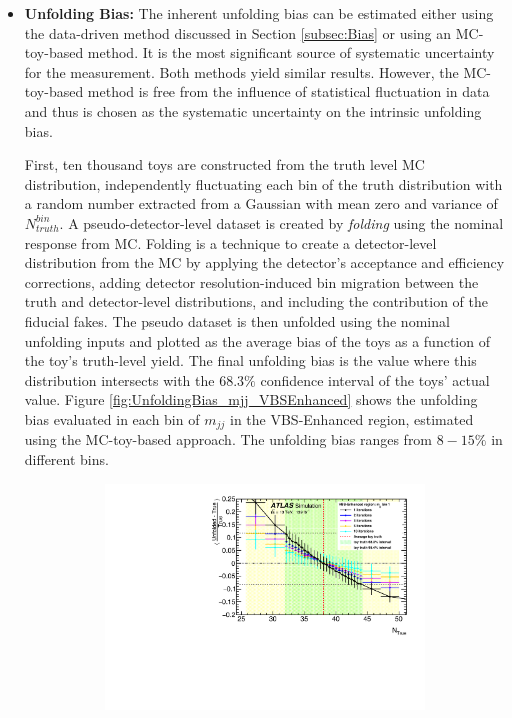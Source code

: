 \begin{itemize}
    \item{\textbf{Unfolding Bias:} The inherent unfolding bias can be estimated either using the data-driven method discussed in Section \ref{subsec:Bias} or using an MC-toy-based method. It is the most significant source of systematic uncertainty for the measurement. Both methods yield similar results. However, the MC-toy-based method is free from the influence of statistical fluctuation in data and thus is chosen as the systematic uncertainty on the intrinsic unfolding bias. 

    First, ten thousand toys are constructed from the truth level MC distribution, independently fluctuating each bin of the truth distribution with a random number extracted from a Gaussian with mean zero and variance of $N_{truth}^{bin}$. A pseudo-detector-level dataset is created by \textit{folding} using the nominal response from MC. Folding is a technique to create a detector-level distribution from the MC by applying the detector's acceptance and efficiency corrections, adding detector resolution-induced bin migration between the truth and detector-level distributions, and including the contribution of the fiducial fakes. The pseudo dataset is then unfolded using the nominal unfolding inputs and plotted as the average bias of the toys as a function of the toy's truth-level yield. The final unfolding bias is the value where this distribution intersects with the $68.3\%$ confidence interval of the toys' actual value. Figure \ref{fig:UnfoldingBias_mjj_VBSEnhanced} shows the unfolding bias evaluated in each bin of $m_{jj}$ in the VBS-Enhanced region, estimated using the MC-toy-based approach. The unfolding bias ranges from $8-15\%$ in different bins.
    \begin{figure}[!htb]
        \centering
        \begin{subfigure}{.48\textwidth}
            \centering
            \includegraphics[width=.9\linewidth]{figures/Analysis/Unfolding/unfoldingbias/unfolding_bias_mjj_VBSEnh_bin1.pdf}

\end{subfigure}
\end{figure}}
\end{itemize}

